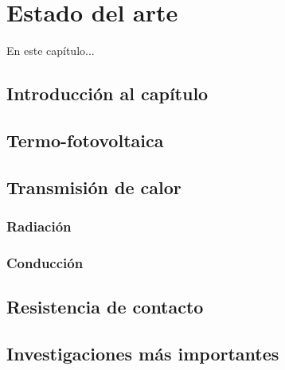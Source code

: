 \chapter{Estado del arte}


En este capítulo...
\cite{noauthor_parallel-plate_nodate}
\cite{doi:MicroGapTPV}
\cite{doi:Thermoionic_Campbell}
\cite{doi:Near-field_ThinFilm}

\section{Introducción al capítulo}
\section{Termo-fotovoltaica}

\section{Transmisión de calor}
\subsection{Radiación}
\subsection{Conducción}
\section{Resistencia de contacto}
\section{Investigaciones más importantes}

